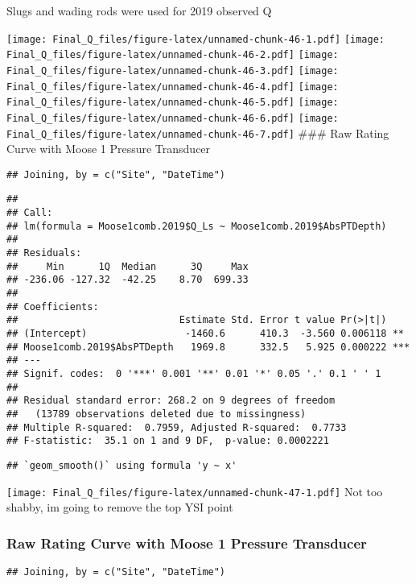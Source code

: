 \documentclass[
]{article}
\begin{document}
Slugs and wading rods were used for 2019 observed Q

\texttt{[image: Final\_Q\_files/figure-latex/unnamed-chunk-46-1.pdf]}
\texttt{[image: Final\_Q\_files/figure-latex/unnamed-chunk-46-2.pdf]}
\texttt{[image: Final\_Q\_files/figure-latex/unnamed-chunk-46-3.pdf]}
\texttt{[image: Final\_Q\_files/figure-latex/unnamed-chunk-46-4.pdf]}
\texttt{[image: Final\_Q\_files/figure-latex/unnamed-chunk-46-5.pdf]}
\texttt{[image: Final\_Q\_files/figure-latex/unnamed-chunk-46-6.pdf]}
\texttt{[image: Final\_Q\_files/figure-latex/unnamed-chunk-46-7.pdf]}
\#\#\# Raw Rating Curve with Moose 1 Pressure Transducer

\begin{verbatim}
## Joining, by = c("Site", "DateTime")
\end{verbatim}

\begin{verbatim}
## 
## Call:
## lm(formula = Moose1comb.2019$Q_Ls ~ Moose1comb.2019$AbsPTDepth)
## 
## Residuals:
##     Min      1Q  Median      3Q     Max 
## -236.06 -127.32  -42.25    8.70  699.33 
## 
## Coefficients:
##                            Estimate Std. Error t value Pr(>|t|)    
## (Intercept)                 -1460.6      410.3  -3.560 0.006118 ** 
## Moose1comb.2019$AbsPTDepth   1969.8      332.5   5.925 0.000222 ***
## ---
## Signif. codes:  0 '***' 0.001 '**' 0.01 '*' 0.05 '.' 0.1 ' ' 1
## 
## Residual standard error: 268.2 on 9 degrees of freedom
##   (13789 observations deleted due to missingness)
## Multiple R-squared:  0.7959, Adjusted R-squared:  0.7733 
## F-statistic:  35.1 on 1 and 9 DF,  p-value: 0.0002221
\end{verbatim}

\begin{verbatim}
## `geom_smooth()` using formula 'y ~ x'
\end{verbatim}

\texttt{[image: Final\_Q\_files/figure-latex/unnamed-chunk-47-1.pdf]} Not
too shabby, im going to remove the top YSI point

\hypertarget{raw-rating-curve-with-moose-1-pressure-transducer-2}{%
\subsubsection{Raw Rating Curve with Moose 1 Pressure
Transducer}\label{raw-rating-curve-with-moose-1-pressure-transducer-2}}

\begin{verbatim}
## Joining, by = c("Site", "DateTime")
\end{verbatim}
\end{document}
